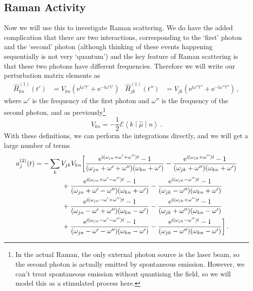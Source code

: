 \documentclass{article}
\theoremstyle{plain}\theoremheaderfont{\normalfont\itshape}\theorembodyfont{\rmfamily}\theoremseparator{.}\newtheorem*{rem}{Remark}\newtheorem*{ex}{Example}\newtheorem*{proof}{Proof}\newtheorem*{altp}{Alternative proof}
\theoremstyle{plain}\theoremheaderfont{\normalfont\bfseries}\theorembodyfont{\rmfamily}\theoremseparator{.}\newtheorem{thm}{Theorem}[section]\newtheorem{lem}[thm]{Lemma}\newtheorem{prop}[thm]{Proposition}\newtheorem*{cor}{Corollary}\newtheorem{defn}[thm]{Definition}\newtheorem{clm}[thm]{Claim}\newtheorem{clminproof}{Claim}
\theoremstyle{break}\theoremheaderfont{\normalfont\itshape}\theorembodyfont{\rmfamily}\theoremseparator{.\medskip}\newtheorem*{proofskip}{Proof}\newtheorem*{exs}{Examples}\newtheorem*{rems}{Remarks}
\theoremstyle{break}\theoremheaderfont{\normalfont\bfseries}\theorembodyfont{\rmfamily}\theoremseparator{.\medskip}\newtheorem{lemskip}[thm]{Lemma}\newtheorem{defnskip}[thm]{Definition}\newtheorem{propskip}[thm]{Proposition}\newtheorem{thmskip}[thm]{Theorem}
\numberwithin{equation}{section}
\newcommand{\ii}{\mathrm{i}}
\newcommand{\ee}{\mathrm{e}}
\newcommand{\mel}[3]{\left\langle #1 \middle| #2 \middle| #3 \right\rangle}
\begin{document}
    \subsection{Raman Activity}
    Now we will use this to investigate Raman scattering. We do have the added complication that there are two interactions, corresponding to the `first' photon and the `second' photon (although thinking of these events happening sequentially is not very `quantum') and the key feature of Raman scattering is that these two photons have different frequencies. Therefore we will write our perturbation matrix elements as
    \begin{align}
        \hat{H}_{kn}^{(1)}(t')&=V_{kn}\left(\ee^{\ii\omega' t'}+\ee^{-\ii\omega' t'}\right) & \hat{H}_{jk}^{(1)}(t'')&=V_{jk}\left(\ee^{\ii\omega'' t''}+\ee^{-\ii\omega'' t''}\right)\,,
    \end{align}
    where \(\omega'\) is the frequency of the first photon and \(\omega''\) is the frequency of the second photon, and as previously\footnote{In the actual Raman, the only external photon source is the laser beam, so the second photon is actually emitted by spontaneous emission. However, we can't treat spontaneous emission without quantising the field, so we will model this as a stimulated process here.}
    \begin{equation}
        V_{kn}=-\frac{1}{2}\mathcal{E}\mel{k}{\hat{\mu}}{n}\,.
    \end{equation}
    With these definitions, we can perform the integrations directly, and we will get a large number of terms
    \begin{align}\label{Raman_coefficient}
        a_j^{(2)}(t)&=-\sum_k V_{jk}V_{kn}\bigg[\frac{\ee^{\ii(\omega_{jn}+\omega'+\omega'')t}-1}{(\omega_{jn}+\omega'+\omega'')(\omega_{kn}+\omega')}-\frac{\ee^{\ii(\omega_{jk}+\omega'')t}-1}{(\omega_{jk}+\omega'')(\omega_{kn}+\omega')} \notag \\
        &\qquad\qquad +\frac{\ee^{\ii(\omega_{jn}+\omega'-\omega'')t}-1}{(\omega_{jn}+\omega'-\omega'')(\omega_{kn}+\omega')}-\frac{\ee^{\ii(\omega_{jk}-\omega'')t}-1}{(\omega_{jk}-\omega'')(\omega_{kn}+\omega')} \notag \\
        &\qquad\qquad +\frac{\ee^{\ii(\omega_{jn}-\omega'+\omega'')t}-1}{(\omega_{jn}-\omega'+\omega'')(\omega_{kn}-\omega')}-\frac{\ee^{\ii(\omega_{jk}+\omega'')t}-1}{(\omega_{jk}+\omega'')(\omega_{kn}-\omega')} \notag \\
        &\qquad\qquad +\frac{\ee^{\ii(\omega_{jn}-\omega'-\omega'')t}-1}{(\omega_{jn}-\omega'-\omega'')(\omega_{kn}-\omega')}-\frac{\ee^{\ii(\omega_{jk}-\omega'')t}-1}{(\omega_{jk}-\omega'')(\omega_{kn}-\omega')}\bigg]\,.
    \end{align}
\end{document}
